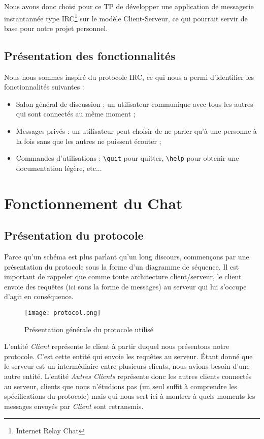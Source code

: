 		Nous avons donc choisi pour ce TP de développer une application de messagerie instantannée type IRC\footnote{Internet Relay Chat} sur le modèle Client-Serveur, ce qui pourrait servir de base pour notre projet personnel.
		

	\section{Présentation des fonctionnalités}
		Nous nous sommes inspiré du protocole IRC, ce qui nous a permi d'identifier les fonctionnalités suivantes :
		\begin{itemize}
			\item Salon général de discussion : un utilisateur communique avec tous les autres qui sont connectés au même moment ;
			\item Messages privés : un utilisateur peut choisir de ne parler qu'à une personne à la fois sans que les autres ne puissent écouter ;
			\item Commandes d'utilisations : \verb!\quit! pour quitter, \verb!\help! pour obtenir une documentation légère, etc...
		\end{itemize}
		

\chapter{Fonctionnement du Chat}
	
	\section{Présentation du protocole}
		Parce qu'un schéma est plus parlant qu'un long discours, commençons par une présentation du protocole sous la forme d'un diagramme de séquence. Il est important de rappeler que comme toute architecture client/serveur, le client envoie des requêtes (ici sous la forme de messages) au serveur qui lui s'occupe d'agit en conséquence.
		\begin{figure}[h!]
			\centering
			\texttt{[image: protocol.png]}
			\caption{Présentation générale du protocole utilisé}
		\end{figure}
		\FloatBarrier
		
		L'entité \emph{Client} représente le client à partir duquel nous présentons notre protocole. C'est cette entité qui envoie les requêtes au serveur. Étant donné que le serveur est un intermédiaire entre plusieurs clients, nous avions besoin d'une autre entité. L'entité \emph{Autres Clients} représente donc les autres clients connectés au serveur, clients que nous n'étudions pas (un seul suffit à comprendre les spécifications du protocole) mais qui nous sert ici à montrer à quels moments les messages envoyés par \emph{Client} sont retransmis.\\
		
